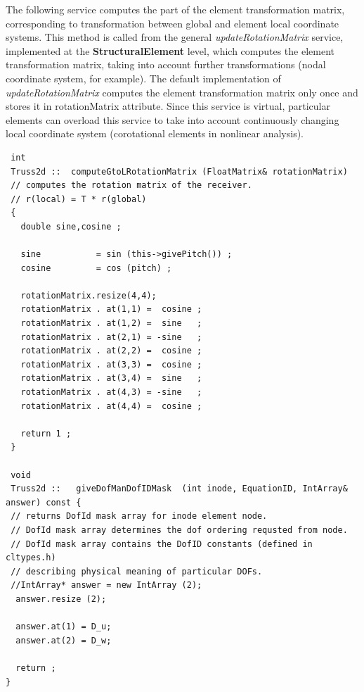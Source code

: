\documentclass[a4paper]{article}
\newcommand{\class}[1]{{\bf #1}}
\newcommand{\service}[1]{{\em #1}}
\newcommand{\attribute}[1]{#1}
\begin{document}
 The following service computes the part of the element transformation
 matrix, corresponding to transformation between global  and element
 local coordinate systems. This method is called from
 the general \service{updateRotationMatrix} service, implemented at
 the \class{StructuralElement} level, which computes the element
 transformation matrix, taking into account further transformations
 (nodal coordinate system, for example). The default implementation of
 \service{updateRotationMatrix} computes the element transformation
 matrix only once and stores it in \attribute{rotationMatrix}
 attribute. Since this service is virtual, particular elements can
 overload this service to take into account continuously changing local
 coordinate system (corotational elements in nonlinear analysis).
 \begin{verbatim}
 int
 Truss2d ::  computeGtoLRotationMatrix (FloatMatrix& rotationMatrix) 
 // computes the rotation matrix of the receiver.
 // r(local) = T * r(global)
 {
   double sine,cosine ;

   sine           = sin (this->givePitch()) ;
   cosine         = cos (pitch) ;

   rotationMatrix.resize(4,4);
   rotationMatrix . at(1,1) =  cosine ;
   rotationMatrix . at(1,2) =  sine   ;
   rotationMatrix . at(2,1) = -sine   ;
   rotationMatrix . at(2,2) =  cosine ;
   rotationMatrix . at(3,3) =  cosine ;
   rotationMatrix . at(3,4) =  sine   ;
   rotationMatrix . at(4,3) = -sine   ;
   rotationMatrix . at(4,4) =  cosine ;

   return 1 ;
 }

 void
 Truss2d ::   giveDofManDofIDMask  (int inode, EquationID, IntArray& answer) const {
 // returns DofId mask array for inode element node.
 // DofId mask array determines the dof ordering requsted from node.
 // DofId mask array contains the DofID constants (defined in cltypes.h)
 // describing physical meaning of particular DOFs.
 //IntArray* answer = new IntArray (2);
  answer.resize (2);

  answer.at(1) = D_u;
  answer.at(2) = D_w;

  return ;
}


 \end{verbatim}
\end{document}
